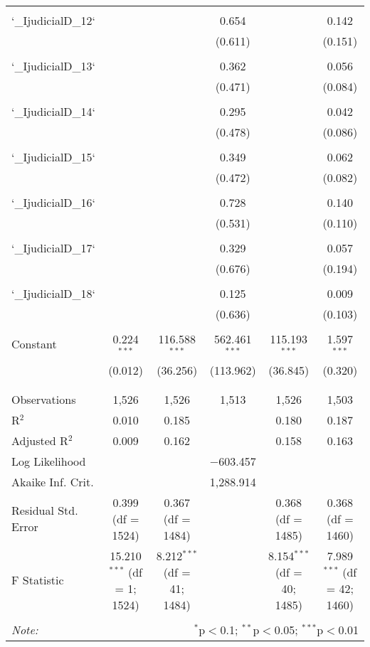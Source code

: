 \begin{table}[!htbp]
\begin{tabular}{@{\extracolsep{5pt}}lccccc}
  & & & & & \\ 
 `\_IjudicialD\_12` &  &  & 0.654 &  & 0.142 \\ 
  &  &  & (0.611) &  & (0.151) \\ 
  & & & & & \\ 
 `\_IjudicialD\_13` &  &  & 0.362 &  & 0.056 \\ 
  &  &  & (0.471) &  & (0.084) \\ 
  & & & & & \\ 
 `\_IjudicialD\_14` &  &  & 0.295 &  & 0.042 \\ 
  &  &  & (0.478) &  & (0.086) \\ 
  & & & & & \\ 
 `\_IjudicialD\_15` &  &  & 0.349 &  & 0.062 \\ 
  &  &  & (0.472) &  & (0.082) \\ 
  & & & & & \\ 
 `\_IjudicialD\_16` &  &  & 0.728 &  & 0.140 \\ 
  &  &  & (0.531) &  & (0.110) \\ 
  & & & & & \\ 
 `\_IjudicialD\_17` &  &  & 0.329 &  & 0.057 \\ 
  &  &  & (0.676) &  & (0.194) \\ 
  & & & & & \\ 
 `\_IjudicialD\_18` &  &  & 0.125 &  & 0.009 \\ 
  &  &  & (0.636) &  & (0.103) \\ 
  & & & & & \\ 
 Constant & 0.224$^{***}$ & 116.588$^{***}$ & 562.461$^{***}$ & 115.193$^{***}$ & 1.597$^{***}$ \\ 
  & (0.012) & (36.256) & (113.962) & (36.845) & (0.320) \\ 
  & & & & & \\ 
\hline \\[-1.8ex] 
Observations & 1,526 & 1,526 & 1,513 & 1,526 & 1,503 \\ 
R$^{2}$ & 0.010 & 0.185 &  & 0.180 & 0.187 \\ 
Adjusted R$^{2}$ & 0.009 & 0.162 &  & 0.158 & 0.163 \\ 
Log Likelihood &  &  & $-$603.457 &  &  \\ 
Akaike Inf. Crit. &  &  & 1,288.914 &  &  \\ 
Residual Std. Error & 0.399 (df = 1524) & 0.367 (df = 1484) &  & 0.368 (df = 1485) & 0.368 (df = 1460) \\ 
F Statistic & 15.210$^{***}$ (df = 1; 1524) & 8.212$^{***}$ (df = 41; 1484) &  & 8.154$^{***}$ (df = 40; 1485) & 7.989$^{***}$ (df = 42; 1460) \\ 
\hline 
\hline \\[-1.8ex] 
\textit{Note:}  & \multicolumn{5}{r}{$^{*}$p$<$0.1; $^{**}$p$<$0.05; $^{***}$p$<$0.01} \\ 
\end{tabular} 
\end{table} 